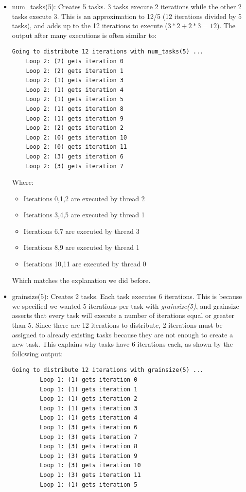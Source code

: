 \documentclass[12]{article}
\begin{document}
\begin{itemize}
    \item num\_tasks(5): Creates 5 tasks. 3 tasks execute 2 iterations while the other 2 tasks execute 3. This is an approximation to 12/5 (12 iterations divided by 5 tasks), and adds up to the 12 iterations to execute ($3*2 + 2*3 = 12$). The output after many executions is often similar to:

    \begin{lstlisting}[frame=single]
    Going to distribute 12 iterations with num_tasks(5) ...
    Loop 2: (2) gets iteration 0
    Loop 2: (2) gets iteration 1
    Loop 2: (1) gets iteration 3
    Loop 2: (1) gets iteration 4
    Loop 2: (1) gets iteration 5
    Loop 2: (1) gets iteration 8
    Loop 2: (1) gets iteration 9
    Loop 2: (2) gets iteration 2
    Loop 2: (0) gets iteration 10
    Loop 2: (0) gets iteration 11
    Loop 2: (3) gets iteration 6
    Loop 2: (3) gets iteration 7
    \end{lstlisting}

    Where: 
    \begin{itemize}
        \item Iterations 0,1,2 are executed by thread 2
        \item Iterations 3,4,5 are executed by thread 1
        \item Iterations 6,7 are executed by thread 3
        \item Iterations 8,9 are executed by thread 1
        \item Iterations 10,11 are executed by thread 0
    \end{itemize}
    Which matches the explanation we did before.

    \item grainsize(5): Creates 2 tasks. Each task executes 6 iterations. This is because we specified we wanted 5 iterations per task with \textit{grainsize(5)}, and grainsize asserts that every task will execute a number of iterations equal or greater than 5. Since there are 12 iterations to distribute, 2 iterations must be assigned to already existing tasks because they are not enough to create a new task. This explains why tasks have 6 iterations each, as shown by the following output:
    
    \begin{lstlisting}[frame=single]
        Going to distribute 12 iterations with grainsize(5) ...
        Loop 1: (1) gets iteration 0
        Loop 1: (1) gets iteration 1
        Loop 1: (1) gets iteration 2
        Loop 1: (1) gets iteration 3
        Loop 1: (1) gets iteration 4
        Loop 1: (3) gets iteration 6
        Loop 1: (3) gets iteration 7
        Loop 1: (3) gets iteration 8
        Loop 1: (3) gets iteration 9
        Loop 1: (3) gets iteration 10
        Loop 1: (3) gets iteration 11
        Loop 1: (1) gets iteration 5
    \end{lstlisting}


\end{itemize}
\end{document}
